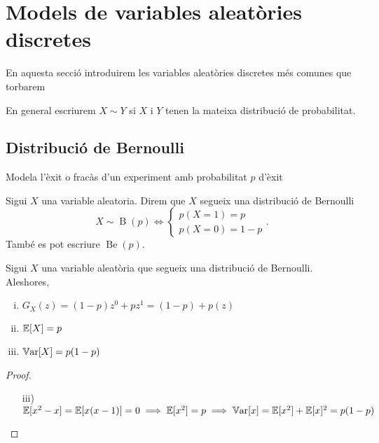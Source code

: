 \section{Models de variables aleatòries discretes}

En aquesta secció introduirem les variables aleatòries discretes més comunes que torbarem

\begin{obs}
    En general escriurem $X \sim Y$ si $X$ i $Y$ tenen la mateixa distribució de probabilitat.
\end{obs}

\subsection*{Distribució de Bernoulli}

Modela l'èxit o fracàs d'un experiment amb probabilitat $p$ d'èxit

\begin{defi}
    Sigui $X$ una variable aleatoria. Direm que $X$ segueix una distribució de Bernoulli 
    \[X \sim \operatorname{B}(p) \iff \begin{cases}
                       p(X=1) = p \\
                       p(X=0) = 1-p
                       \end{cases}.
    \]
    També es pot escriure $\operatorname{Be}(p)$.
\end{defi}

\begin{prop}
    Sigui $X$ una variable aleatòria que segueix una distribució de Bernoulli. Aleshores,
    \begin{enumerate}[i)]
        \item $G_X(z) = (1-p)z^0 + pz^1 = (1-p) + p(z)$
        \item $\operatorname{\mathbb{E}}[X] = p$
        \item $\operatorname{\mathbb{V}ar}[X] = p(1-p)$
    \end{enumerate}
\end{prop}

\begin{proof}
    \begin{enumerate}[i)]
        \item[]
        \item[iii)] $\operatorname{\mathbb{E}}[x^2-x]= \operatorname{\mathbb{E}}[x(x-1)] = 0 \implies \operatorname{\mathbb{E}}[x^2] = p \implies \operatorname{\mathbb{V}ar}[x] = \operatorname{\mathbb{E}}[x^2] + \operatorname{\mathbb{E}}[x]^2
        = p(1-p)$
    \end{enumerate}
\end{proof}

